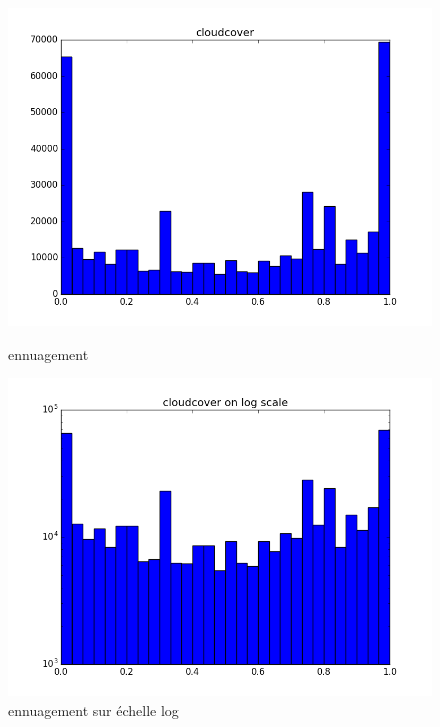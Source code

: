 \begin{figure}[H]
	\captionsetup{labelformat=empty}
	\includegraphics[width=\linewidth]{images/ennuagement.png}
	\caption{ennuagement}
	\endminipage\hfill
	\includegraphics[width=\linewidth]{images/log_ennuagement.png}
	\caption{ennuagement sur échelle log}
	\endminipage\hfill
\end{figure}

